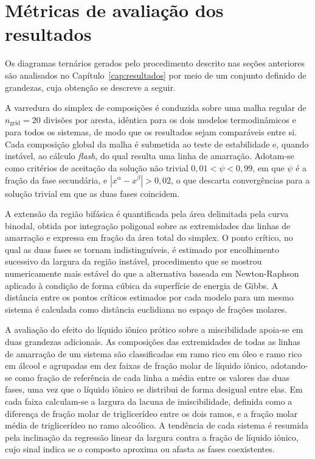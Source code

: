 \section{Métricas de avaliação dos resultados}
\label{sec:metricas}
 
Os diagramas ternários gerados pelo procedimento descrito nas seções anteriores são analisados no Capítulo~\ref{cap:resultados} por meio de um conjunto definido de grandezas, cuja obtenção se descreve a seguir.
 
A varredura do simplex de composições é conduzida sobre uma malha regular de $n_{\text{grid}} = 20$ divisões por aresta, idêntica para os dois modelos termodinâmicos e para todos os sistemas, de modo que os resultados sejam comparáveis entre si. Cada composição global da malha é submetida ao teste de estabilidade e, quando instável, ao cálculo \textit{flash}, do qual resulta uma linha de amarração. Adotam-se como critérios de aceitação da solução não trivial $0{,}01 < \psi < 0{,}99$, em que $\psi$ é a fração da fase secundária, e $|x^{\alpha} - x^{\beta}| > 0{,}02$, o que descarta convergências para a solução trivial em que as duas fases coincidem.
 
A extensão da região bifásica é quantificada pela área delimitada pela curva binodal, obtida por integração poligonal sobre as extremidades das linhas de amarração e expressa em fração da área total do simplex. O ponto crítico, no qual as duas fases se tornam indistinguíveis, é estimado por encolhimento sucessivo da largura da região instável, procedimento que se mostrou numericamente mais estável do que a alternativa baseada em Newton-Raphson aplicado à condição de forma cúbica da superfície de energia de Gibbs. A distância entre os pontos críticos estimados por cada modelo para um mesmo sistema é calculada como distância euclidiana no espaço de frações molares.
 
A avaliação do efeito do líquido iônico prótico sobre a miscibilidade apoia-se em duas grandezas adicionais. As composições das extremidades de todas as linhas de amarração de um sistema são classificadas em ramo rico em óleo e ramo rico em álcool e agrupadas em dez faixas de fração molar de líquido iônico, adotando-se como fração de referência de cada linha a média entre os valores das duas fases, uma vez que o líquido iônico se distribui de forma desigual entre elas. Em cada faixa calculam-se a largura da lacuna de imiscibilidade, definida como a diferença de fração molar de triglicerídeo entre os dois ramos, e a fração molar média de triglicerídeo no ramo alcoólico. A tendência de cada sistema é resumida pela inclinação da regressão linear da largura contra a fração de líquido iônico, cujo sinal indica se o composto aproxima ou afasta as fases coexistentes.
 

